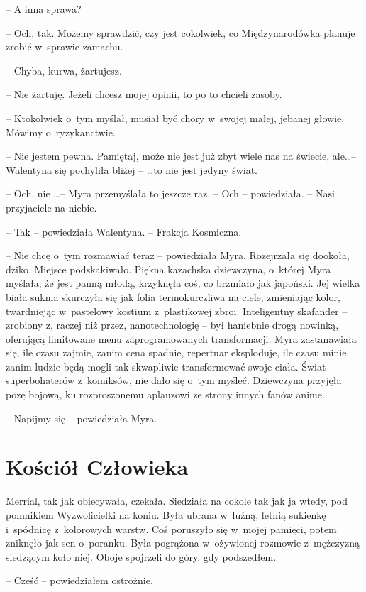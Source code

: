 \documentclass[oneside,polish,11pt,sfheadings]{mwbk}
\begin{document}
-- A inna sprawa?

-- Och, tak. Możemy sprawdzić, czy jest cokolwiek, co Międzynarodówka
planuje zrobić w~sprawie zamachu.

-- Chyba, kurwa, żartujesz.

-- Nie żartuję. Jeżeli chcesz mojej opinii, to po to chcieli zasoby.

-- Ktokolwiek o~tym myślał, musiał być chory w~swojej małej, jebanej
głowie. Mówimy o~ryzykanctwie.

-- Nie jestem pewna. Pamiętaj, może nie jest już zbyt wiele nas na
świecie, ale\ldots -- Walentyna się pochyliła bliżej -- \ldots to nie jest
jedyny świat.

-- Och, nie \ldots -- Myra przemyślała to jeszcze raz. -- Och -- powiedziała. -- Nasi przyjaciele na niebie.

-- Tak -- powiedziała Walentyna. -- Frakcja Kosmiczna.

-- Nie chcę o~tym rozmawiać teraz -- powiedziała Myra. Rozejrzała się
dookoła, dziko. Miejsce podskakiwało. Piękna kazachska dziewczyna, o~której Myra myślała, że jest panną młodą, krzyknęła coś, co brzmiało jak
japoński. Jej wielka biała suknia skurczyła się jak folia termokurczliwa
na ciele, zmieniając kolor, twardniejąc w~pastelowy kostium z~plastikowej zbroi. Inteligentny skafander -- zrobiony z, raczej niż
przez, nanotechnologię -- był haniebnie drogą nowinką, oferującą
limitowane menu zaprogramowanych transformacji. Myra zastanawiała się,
ile czasu zajmie, zanim cena spadnie, repertuar eksploduje, ile czasu
minie, zanim ludzie będą mogli tak skwapliwie transformować swoje ciała.
Świat superbohaterów z~komiksów, nie dało się o~tym myśleć. Dziewczyna
przyjęła pozę bojową, ku rozproszonemu aplauzowi ze strony innych fanów
anime.

-- Napijmy się -- powiedziała Myra.


\chapter{Kościół Człowieka}

Merrial, tak jak obiecywała, czekała. Siedziała na cokole tak jak ja
wtedy, pod pomnikiem Wyzwolicielki na koniu. Była ubrana w~luźną, letnią
sukienkę i~spódnicę z~kolorowych warstw. Coś poruszyło się w~mojej
pamięci, potem zniknęło jak sen o~poranku. Była pogrążona w~ożywionej
rozmowie z~mężczyzną siedzącym koło niej. Oboje spojrzeli do góry, gdy
podszedłem.

-- Cześć -- powiedziałem ostrożnie.
\end{document}
